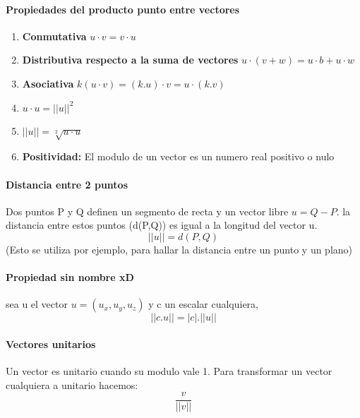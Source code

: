 \documentclass[11pt]{article}
\begin{document}
\paragraph{Propiedades del producto punto entre vectores}
\begin{enumerate}
	\item \textbf{Conmutativa} $u \cdot v = v \cdot u$
	\item \textbf{Distributiva respecto a la suma de vectores} $u \cdot (v + w) = u \cdot b + u \cdot w$
	\item \textbf{Asociativa} $k (u \cdot v) = (k.u) \cdot v = u \cdot (k.v)$
	\item $ u \cdot u = ||u||^2 $
	\item $||u|| = \sqrt[2]{u \cdot u}$
	\item \textbf{Positividad:} El modulo de un vector es un numero real positivo o nulo
\end{enumerate}
\paragraph{Distancia entre 2 puntos} 
Dos puntos P y Q definen un segmento de recta y un vector libre $u = Q - P$. la distancia
entre estos puntos (d(P,Q)) es igual a la longitud del vector u.
\begin{equation*}
	||u|| = d(P,Q)
\end{equation*}
(Esto se utiliza por ejemplo, para hallar la distancia entre un punto y un plano)
\paragraph{Propiedad sin nombre xD}
sea u el vector $u = (u_x, u_y, u_z)$ y c un escalar cualquiera,
\begin{equation*}
	||c.u|| = |c| . ||u||
\end{equation*}
\paragraph{Vectores unitarios}
Un vector es unitario cuando su modulo vale 1. Para transformar un vector cualquiera a unitario hacemos:
\begin{equation*}
	\dfrac{v}{||v||}
\end{equation*}
\end{document}
